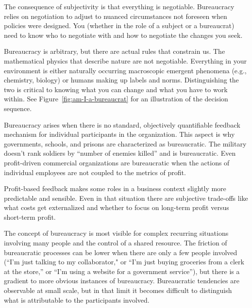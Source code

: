 The consequence of subjectivity is that everything is negotiable. Bureaucracy relies on negotiation to adjust to nuanced circumstances not foreseen when policies were designed.  You (whether in the role of a subject or a bureaucrat) need to know who to negotiate with and how to negotiate the changes you seek. 

Bureaucracy is arbitrary, but there are actual rules that constrain us. The mathematical physics that describe nature are not negotiable. Everything in your environment is either naturally occurring macroscopic emergent phenomena (e.g., chemistry, biology) or humans making up labels and norms. Distinguishing the two is critical to knowing what you can change and what you have to work within. See Figure~\ref{fig:am-I-a-bureaucrat}\iftoggle{haspagenumbers}{ on page~\pageref{fig:am-I-a-bureaucrat}}{ } for an illustration of the decision sequence.

Bureaucracy arises when there is no standard, objectively quantifiable feedback mechanism for individual participants in the organization. This aspect is why governments, schools, and prisons are characterized as bureaucratic. 
The military doesn't rank soldiers by ``number of enemies killed'' and is bureaucratic. 
Even profit-driven commercial organizations are bureaucratic when the actions of individual employees are not coupled to the metrics of profit. %


Profit-based feedback makes some roles in a business context slightly more predictable and sensible. Even in that situation there are subjective trade-offs like what costs get externalized and whether to focus on long-term profit versus short-term profit. 

The concept of bureaucracy is most visible for complex recurring situations involving many people and the control of a shared resource. The friction of bureaucratic processes can be lower when there are only a few people involved (``I'm just talking to my collaborator," or ``I'm just buying groceries from a clerk at the store,'' or ``I'm using a website for a government service''), but there is a gradient to more obvious instances of bureaucracy. Bureaucratic tendencies are observable at small scale, but in that limit it becomes difficult to distinguish what is attributable to the participants involved.

